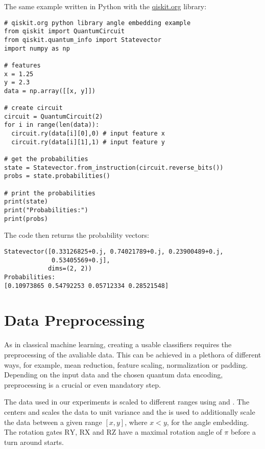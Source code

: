 \newpage
The same example written in Python with the \href{https://qiskit.org/documentation/}{qiskit.org} library:

\begin{verbatim}
# qiskit.org python library angle embedding example
from qiskit import QuantumCircuit
from qiskit.quantum_info import Statevector
import numpy as np

# features
x = 1.25
y = 2.3
data = np.array([[x, y]])

# create circuit
circuit = QuantumCircuit(2)
for i in range(len(data)):
  circuit.ry(data[i][0],0) # input feature x
  circuit.ry(data[i][1],1) # input feature y

# get the probabilities
state = Statevector.from_instruction(circuit.reverse_bits())
probs = state.probabilities()

# print the probabilities
print(state)
print("Probabilities:")
print(probs)
\end{verbatim}

\noindent The code then returns the probability vectors:
\begin{verbatim}
Statevector([0.33126825+0.j, 0.74021789+0.j, 0.23900489+0.j,
             0.53405569+0.j],
            dims=(2, 2))
Probabilities:
[0.10973865 0.54792253 0.05712334 0.28521548]
\end{verbatim}

\section{Data Preprocessing}
As in classical machine learning, creating a usable classifiers requires the preprocessing of the avaliable data. This can be achieved in a plethora of different ways, for example, mean reduction, feature scaling, normalization or padding. Depending on the input data and the chosen quantum data encoding, preprocessing is a crucial or even mandatory step\cite{PoincarDataPreprocessinForQuantumMachineLearning_2021,VariationalClassifierPennyLane,SHRIVASTAVA20201849}. 

The data used in our experiments is scaled to different ranges using  \cite{scikit_sklearnpreprocessingminmaxscaler_nodate} and \cite{scikit_sklearnpreprocessingstandardscaler_nodate}. The  centers and scales the data to unit variance and the  is used to additionally scale the data between a given range $[x, y]$, where $x < y$, for the angle embedding. The rotation gates $\mathrm{RY}$, $\mathrm{RX}$ and $\mathrm{RZ}$ have a maximal rotation angle of $\pi$ before a turn around starts.

